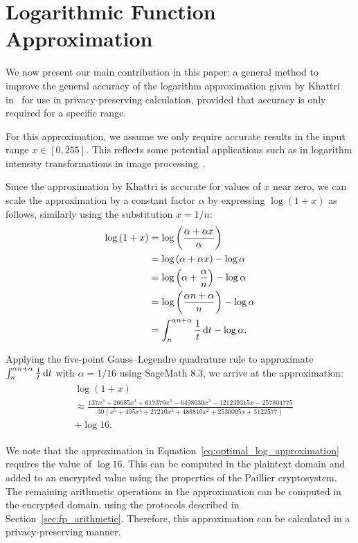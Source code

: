\section{Logarithmic Function Approximation}
\label{sec:logarithm_approximation}
We now present our main contribution in this paper: a general method to improve the general accuracy of the logarithm approximation given by Khattri in~\cite{khattri_new_2009} for use in privacy-preserving calculation, provided that accuracy is only required for a specific range.

For this approximation, we assume we only require accurate results in the input range $x \in [0, 255]$. This reflects some potential applications such as in logarithm intensity transformations in image processing~\cite{gonzalez_digital_2008}.

Since the approximation by Khattri is accurate for values of $x$ near zero, we can scale the approximation by a constant factor $\alpha$ by expressing $\log(1+x)$ as follows, similarly using the substitution $x=1/n$:
\begin{align*}
	\log{\left(1+x\right)} &= \log{\left(\frac{\alpha + \alpha x}{\alpha}\right)}\\
	&= \log{(\alpha + \alpha x)} - \log{\alpha}\\
	&= \log{\left(\alpha+\frac{\alpha}{n}\right)} - \log{\alpha}\\
	&= \log{\left(\frac{\alpha n + \alpha}{n}\right)} - \log{\alpha}\\
	&= \int_{n}^{\alpha n + \alpha}{\frac{1}{t}\mathop{}\!\mathrm{d} t} - \log{\alpha}.
\end{align*}

Applying the five-point Gauss--Legendre quadrature rule to approximate $\int_{n}^{\alpha n + \alpha}{\frac{1}{t}\mathop{}\!\mathrm{d} t}$ with $\alpha = 1/16$ using SageMath 8.3, we arrive at the approximation:
\begin{align}\label{eq:optimal_log_approximation}
	\begin{split}
		&\log\left(1+x\right) \\
		&\approx \frac{137x^5 + 26685x^4 + 617370x^3 - 6498630x^2 - 121239315x - 257804775}
		{30(x^5 + 405x^4 + 27210x^3 + 488810x^2 + 2536005x + 3122577)}\\
		&+ \log{16}.
	\end{split}
\end{align}

We note that the approximation in Equation~\ref{eq:optimal_log_approximation} requires the value of $\log{16}$. This can be computed in the plaintext domain and added to an encrypted value using the properties of the Paillier cryptosystem. The remaining arithmetic operations in the approximation can be computed in the encrypted domain, using the protocols described in Section~\ref{sec:fp_arithmetic}. Therefore, this approximation can be calculated in a privacy-preserving manner.

